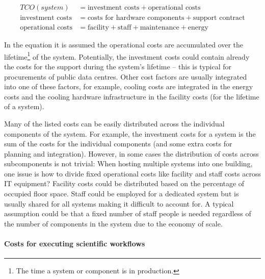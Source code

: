 \documentclass{../../template/esiwace-report}
\begin{document}
\begin{align}
\label{eq:tco}
TCO(system)  & = \mbox{investment costs} + \mbox{operational costs} \nonumber \\
\mbox{investment costs} & = \mbox{costs for hardware components} + \mbox{support contract} \\
\mbox{operational costs} & = \mbox{facility} + \mbox{staff} + \mbox{maintenance} + \mbox{energy} \nonumber
\end{align}

In the equation it is assumed the operational costs are accumulated over the lifetime\footnote{The time a system or component is in production.} of the system.
Potentially, the investment costs could contain already the costs for the support during the system's lifetime -- this is typical for procurements of public data centres.
Other cost factors are usually integrated into one of these factors, for example, cooling costs are integrated in the energy costs and the cooling hardware infrastructure in the facility costs (for the lifetime of a system).

Many of the listed costs can be easily distributed across the individual components of the system.
For example, the investment costs for a system is the sum of the costs for the individual components (and some extra costs for planning and integration).
However, in some cases the distribution of costs across subcomponents is not trivial:
When hosting multiple systems into one building, one issue is how to divide fixed operational costs like facility and staff costs across IT equipment?
Facility costs could be distributed based on the percentage of occupied floor space.
Staff could be employed for a dedicated system but is usually shared for all systems making it difficult to account for.
A typical assumption could be that a fixed number of staff people is needed regardless of the number of components in the system due to the economy of scale.




\paragraph{Costs for executing scientific workflows}
\end{document}
